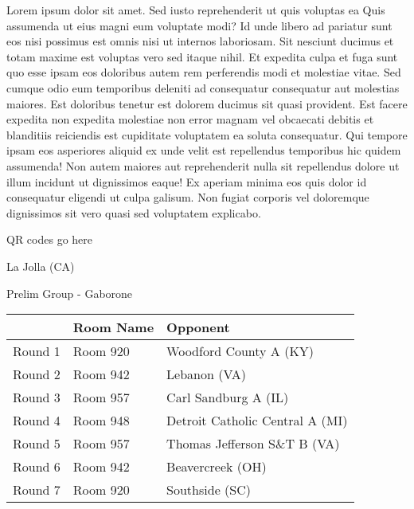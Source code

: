 \documentclass{article}%
\begin{document}
\vspace*{8pt}%
\linebreak%
\newline%
\newline%
Lorem ipsum dolor sit amet. Sed iusto reprehenderit ut quis voluptas ea Quis assumenda ut eius magni eum voluptate modi? Id unde libero ad pariatur sunt eos nisi possimus est omnis nisi ut internos laboriosam. Sit nesciunt ducimus et totam maxime est voluptas vero sed itaque nihil. Et expedita culpa et fuga sunt quo esse ipsam eos doloribus autem rem perferendis modi et molestiae vitae.\newline%
\newline%
Sed cumque odio eum temporibus deleniti ad consequatur consequatur aut molestias maiores. Est doloribus tenetur est dolorem ducimus sit quasi provident. Est facere expedita non expedita molestiae non error magnam vel obcaecati debitis et blanditiis reiciendis est cupiditate voluptatem ea soluta consequatur. Qui tempore ipsam eos asperiores aliquid ex unde velit est repellendus temporibus hic quidem assumenda!\newline%
\newline%
Non autem maiores aut reprehenderit nulla sit repellendus dolore ut illum incidunt ut dignissimos eaque! Ex aperiam minima eos quis dolor id consequatur eligendi ut culpa galisum. Non fugiat corporis vel doloremque dignissimos sit vero quasi sed voluptatem explicabo.\newline%
\newline%
%
\vspace*{30pt}%
\begin{center}%
\begin{Huge}%
QR codes go here%
\end{Huge}%
\end{center}%
\newpage%
%
\begin{center}%
\begin{Huge}%
La Jolla (CA)%
\end{Huge}%
\vspace*{8pt}%
\linebreak%
\begin{Large}%
Prelim Group {-} Gaborone%
\end{Large}%
\end{center}%
\begin{tabularx}{\textwidth}{|c|Y|Y|}%
\hline%
&Room Name&Opponent\\%
\hline%
Round 1&Room 920&Woodford County A (KY)\\%
Round 2&Room 942&Lebanon (VA)\\%
Round 3&Room 957&Carl Sandburg A (IL)\\%
Round 4&Room 948&Detroit Catholic Central A (MI)\\%
Round 5&Room 957&Thomas Jefferson S\&T B (VA)\\%
Round 6&Room 942&Beavercreek (OH)\\%
Round 7&Room 920&Southside (SC)\\%
\hline%
\end{tabularx}%
\end{document}
